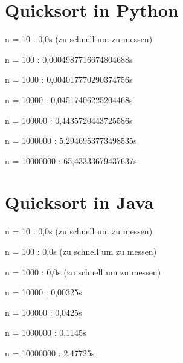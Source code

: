 \chapter{Quicksort in Python}

\label{quicksort:pyton}
n = 10 : 0,0s (zu schnell um zu messen)\par
n = 100 : 0,0004987716674804688s\par
n = 1000 : 0,004017770290374756s\par
n = 10000 : 0,04517406225204468s\par
n = 100000 : 0,4435720443725586s\par
n = 1000000 : 5,2946953773498535s\par
n = 10000000 : 65,43333679437637s
\chapter{Quicksort in Java}
\label{quicksort:java}

n = 10 : 0,0s (zu schnell um zu messen)\par
n = 100 : 0,0s (zu schnell um zu messen)\par
n = 1000 : 0,0s (zu schnell um zu messen)\par
n = 10000 : 0,00325s\par
n = 100000 : 0,0425s\par
n = 1000000 : 0,1145s\par
n = 10000000 : 2,47725s
